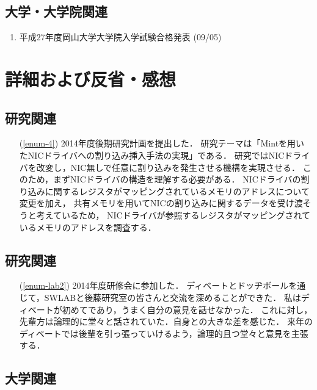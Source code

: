 \documentclass[fleqn, 14pt]{extarticle}
\begin{document}
\subsection{大学・大学院関連}
\label{sec-2-3}

\begin{enumerate}
\item 平成27年度岡山大学大学院入学試験合格発表
\hfill
\label{enum-univ2}
(09/05)
\end{enumerate}





\section{詳細および反省・感想}
\label{sec-3}
\subsection{研究関連}
\label{sec-3-1}

\begin{itemize}
\item[(\ref{enum-4})]
2014年度後期研究計画を提出した．
研究テーマは「Mintを用いたNICドライバへの割り込み挿入手法の実現」である．
研究ではNICドライバを改変し，NIC無しで任意に割り込みを発生させる機構を実現させる．
このため，まずNICドライバの構造を理解する必要がある．
NICドライバの割り込みに関するレジスタがマッピングされているメモリのアドレスについて変更を加え，
共有メモリを用いてNICの割り込みに関するデータを受け渡そうと考えているため，
NICドライバが参照するレジスタがマッピングされているメモリのアドレスを調査する．
\end{itemize}
\subsection{研究関連}
\label{sec-3-2}

\begin{itemize}
\item[(\ref{enum-lab2})]
2014年度研修会に参加した．
ディベートとドッヂボールを通じて，SWLABと後藤研究室の皆さんと交流を深めることができた．
私はディベートが初めてであり，うまく自分の意見を話せなかった．
これに対し，先輩方は論理的に堂々と話されていた．自身との大きな差を感じた．
来年のディベートでは後輩を引っ張っていけるよう，論理的且つ堂々と意見を主張する．
\end{itemize}

\subsection{大学関連}
\label{sec-3-3}
\end{document}
